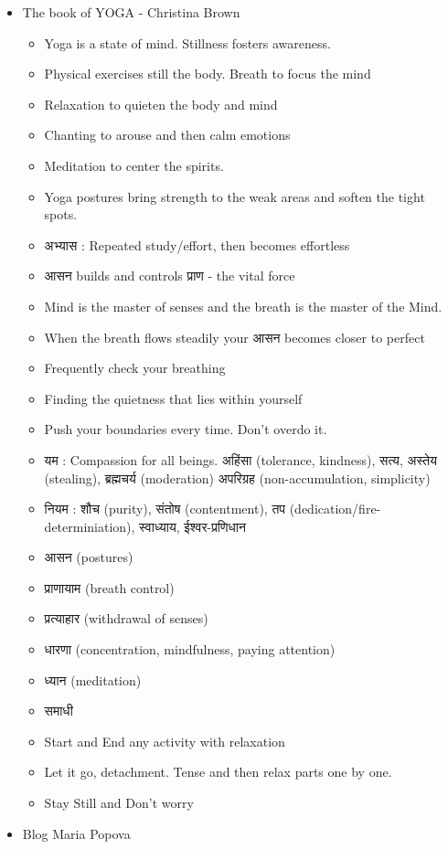 \begin{itemize}[noitemsep,nolistsep]
\item The book of YOGA - Christina Brown
	\begin{itemize}[noitemsep,nolistsep]
	\item Yoga is a state of mind. Stillness fosters awareness.
	\item Physical exercises still the body. Breath to focus the mind
	\item Relaxation to quieten the body and mind
	\item Chanting to arouse and then calm emotions
	\item Meditation to center the spirits.
	\item Yoga postures bring strength to the weak areas and soften the tight spots.
	\item अभ्यास : Repeated study/effort, then becomes effortless
	\item  आसन builds and controls प्राण  - the vital force
	\item Mind is the master of senses and the breath is the master of the Mind.
	\item When the breath flows steadily your आसन becomes closer to perfect
	\item Frequently check your breathing
	\item Finding the quietness that lies within yourself
	\item Push your boundaries every time. Don't overdo it.
	\item यम : Compassion for all beings. अहिंसा (tolerance, kindness), सत्य, अस्तेय (stealing), ब्रह्मचर्य (moderation) अपरिग्रह (non-accumulation, simplicity)
	\item नियम : शौच (purity), संतोष (contentment), तप (dedication/fire-determiniation), स्वाध्याय, ईश्वर-प्रणिधान
	\item आसन  (postures)
	\item प्राणायाम (breath control)
	\item  प्रत्याहार (withdrawal of senses)
	\item धारणा (concentration, mindfulness, paying attention)
	\item ध्यान (meditation)
	\item समाधी
	\item Start and End any activity with relaxation
	\item Let it go, detachment. Tense and then relax parts one by one.
	\item Stay Still and Don't worry
	\end{itemize}
\item Blog Maria Popova

\end{itemize}
